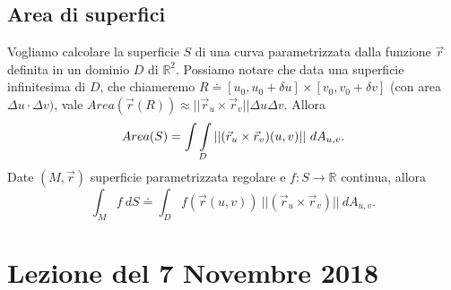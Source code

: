 \documentclass[10pt]{article}
\theoremstyle{plain}
\theoremstyle{definition}
\begin{document}
\subsection{Area di superfici}
Vogliamo calcolare la superficie $S$ di una curva parametrizzata dalla funzione $\vec{r}$ definita in un dominio $D$ di $\mathbb{R}^2$. Possiamo notare che data una superficie infinitesima di $D$, che chiameremo $R\doteq [u_0, u_0+\delta u]\times [v_0, v_0  +\delta v]$ (con area $ \Delta u \cdot \Delta v )$, vale $Area(\vec{r}(R))\approx ||\vec{r}_u \times \vec{r}_v||\Delta u \Delta v $.
Allora 
$$ Area(S)= \int \int\displaylimits_D ||(\vec{r}_u \times \vec{r}_v)(u,v)||\ dA_{u,v}.
$$
Date $(M,\vec{r})$ superficie parametrizzata regolare e $f:S\to \mathbb{R}$ continua, allora
$$\int_M f\ dS\doteq \int_D f( \vec{r}(u,v) )\ ||(\vec{r}_u \times \vec{r}_v)||\ dA_{u,v}.$$

\section{Lezione del 7 Novembre 2018}
\end{document}
